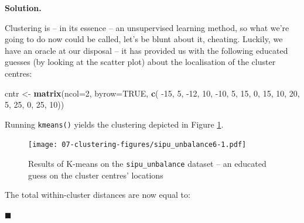 \documentclass[10pt,b5paper,krantz1]{krantz}
\newenvironment{Shaded}{\begin{snugshade}}{\end{snugshade}}
\newcommand{\DataTypeTok}[1]{\textcolor[rgb]{0.27,0.27,0.27}{#1}}
\newcommand{\DecValTok}[1]{\textcolor[rgb]{0.06,0.06,0.06}{#1}}
\newcommand{\KeywordTok}[1]{\textcolor[rgb]{0.27,0.27,0.27}{\textbf{#1}}}
\newcommand{\NormalTok}[1]{#1}
\newcommand{\OperatorTok}[1]{\textcolor[rgb]{0.43,0.43,0.43}{\textbf{#1}}}
\newcommand{\OtherTok}[1]{\textcolor[rgb]{0.37,0.37,0.37}{#1}}
\newcommand{\StringTok}[1]{\textcolor[rgb]{0.5,0.5,0.5}{#1}}
\newenvironment{solution}{%
\bigskip\noindent\textbf{Solution. }%
\it\ignorespaces%
\ignorespaces%
}{\ignorespaces%
\hfill$\blacksquare$%
}
\begin{document}
\begin{solution}

Clustering is -- in its essence -- an unsupervised learning method,
so what we're going to do now could be called, let's be blunt about it, cheating.
Luckily, we have an oracle at our disposal -- it has provided us
with the following educated guesses (by looking at the scatter plot)
about the localisation of the cluster centres:

\begin{Shaded}
\begin{Highlighting}[]
\NormalTok{cntr <-}\StringTok{ }\KeywordTok{matrix}\NormalTok{(}\DataTypeTok{ncol=}\DecValTok{2}\NormalTok{, }\DataTypeTok{byrow=}\OtherTok{TRUE}\NormalTok{, }\KeywordTok{c}\NormalTok{(}
   \DecValTok{-15}\NormalTok{,   }\DecValTok{5}\NormalTok{,}
   \DecValTok{-12}\NormalTok{,   }\DecValTok{10}\NormalTok{,}
   \DecValTok{-10}\NormalTok{,   }\DecValTok{5}\NormalTok{,}
    \DecValTok{15}\NormalTok{,   }\DecValTok{0}\NormalTok{,}
    \DecValTok{15}\NormalTok{,   }\DecValTok{10}\NormalTok{,}
    \DecValTok{20}\NormalTok{,   }\DecValTok{5}\NormalTok{,}
    \DecValTok{25}\NormalTok{,   }\DecValTok{0}\NormalTok{,}
    \DecValTok{25}\NormalTok{,   }\DecValTok{10}\NormalTok{))}
\end{Highlighting}
\end{Shaded}

Running \texttt{kmeans()} yields the clustering depicted in Figure \ref{fig:sipu_unbalance6}.

\begin{Shaded}
\end{Shaded}

\begin{figure}
\hypertarget{fig:sipu_unbalance6}{%
\centering
\texttt{[image: 07-clustering-figures/sipu\_unbalance6-1.pdf]}
\caption{Results of K-means on the \texttt{sipu\_unbalance} dataset -- an educated guess on the cluster centres' locations}\label{fig:sipu_unbalance6}
}
\end{figure}

The total within-cluster distances are now equal to:

\begin{Shaded}
\end{Shaded}


\end{solution}
\end{document}

